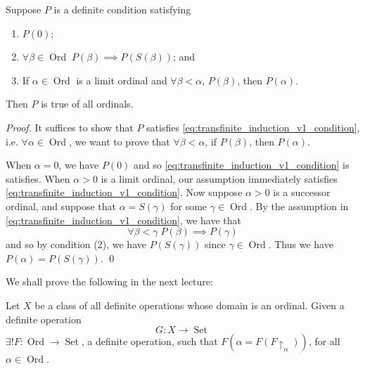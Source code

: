 \documentclass[notoc,notitlepage]{tufte-book}
\DeclareMathOperator{\Ord}{Ord }
\DeclareMathOperator{\Set}{Set }
\begin{document}
\begin{thm}
\label{thm:transfinite_induction_theorem_v2}
  Suppose $P$ is a definite condition satisfying
  \begin{enumerate}
    \item $P(0)$;
    \item $\forall \beta \in \Ord \; P(\beta) \implies P(S(\beta))$; and
    \item If $\alpha \in \Ord$ is a limit ordinal and $\forall \beta < \alpha$, $P(\beta)$, then $P(\alpha)$.
  \end{enumerate}
  Then $P$ is true of all ordinals.
\end{thm}

\begin{proof}
  It suffices to show that $P$ satisfies \cref{eq:transfinite_induction_v1_condition}, i.e. $\forall \alpha \in \Ord$, we want to prove that $\forall \beta < \alpha$, if $P(\beta)$, then $P(\alpha)$.

  When $\alpha = 0$, we have $P(0)$ and so \cref{eq:transfinite_induction_v1_condition} is satisfies. When $\alpha > 0$ is a limit ordinal, our assumption immediately satisfies \cref{eq:transfinite_induction_v1_condition}. Now suppose $\alpha > 0$ is a successor ordinal, and suppose that $\alpha = S(\gamma)$ for some $\gamma \in \Ord$. By the assumption in \cref{eq:transfinite_induction_v1_condition}, we have that
  \begin{equation*}
    \forall \beta < \gamma \; P(\beta) \implies P(\gamma)
  \end{equation*}
  and so by condition (2), we have $P(S(\gamma))$ since $\gamma \in \Ord$. Thus we have $P(\alpha) = P(S(\gamma))$. \qed
\end{proof}

We shall prove the following in the next lecture:

\begin{thmnonum}
  Let $X$ be a class of all definite operations whose domain is an ordinal. Given a definite operation
  \begin{equation*}
    G : X \to \Set
  \end{equation*}
  $\exists ! F : \Ord \to \Set$, a definite operation, such that $F(\alpha = F(F \restriction_{\alpha}))$, for all $\alpha \in \Ord$.
\end{thmnonum}
\end{document}
